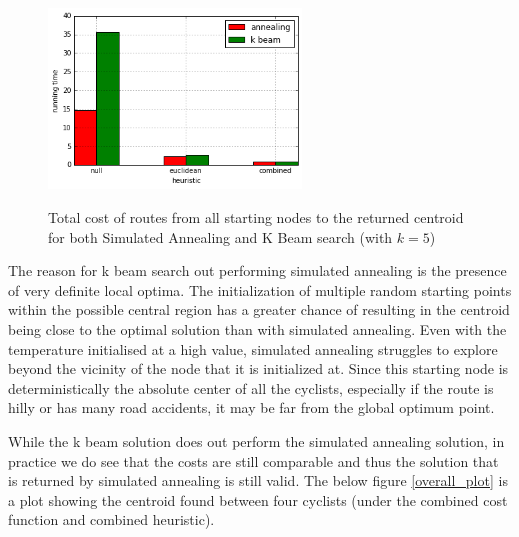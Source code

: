 \documentclass[11pt]{article}
\begin{document}
\begin{figure}[H]
\center
\caption{Total cost of routes from all starting nodes to the returned centroid for both Simulated Annealing and K Beam search (with $k = 5$)}
\includegraphics[width=0.6\textwidth]{../images/k_beam_sim_running_time.png}
\label{sim_ann_and_k_beam_time}
\end{figure}

The reason for k beam search out performing simulated annealing is the presence of very definite local optima. The initialization of multiple random starting points within the possible central region has a greater chance of resulting in the centroid being close to the optimal solution than with simulated annealing. Even with the temperature initialised at a high value, simulated annealing struggles to explore beyond the vicinity of the node that it is initialized at.  Since this starting node is deterministically the absolute center of all the cyclists, especially if the route is hilly or has many road accidents, it may be far from the global optimum point.
\par
While the k beam solution does out perform the simulated annealing solution, in practice we do see that the costs are still comparable and thus the solution that is returned by simulated annealing is still valid. The below figure \ref{overall_plot} is a plot showing the centroid found between four cyclists (under the combined cost function and combined heuristic).
\end{document}

